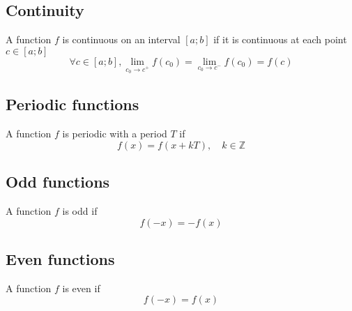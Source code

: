 \documentclass[a4paper]{article}
\begin{document}
\subsection{Continuity}

A function \(f\) is continuous on an interval \([a;b]\) if it is continuous at each point \(c \in [a;b]\)
\[
    \forall c \in [a;b],
    \lim_{c_0 \to c^+} f(c_0) = \lim_{c_0 \to c^-} f(c_0) = f(c)
\]

\subsection{Periodic functions}

A function \(f\) is periodic with a period \(T\) if
\[
    f(x) = f(x + kT), \quad k \in \mathbb{Z}
\]

\subsection{Odd functions}

A function \(f\) is odd if
\[
    f(-x) = -f(x)
\]

\subsection{Even functions}

A function \(f\) is even if
\[
    f(-x) = f(x)
\]
\end{document}
